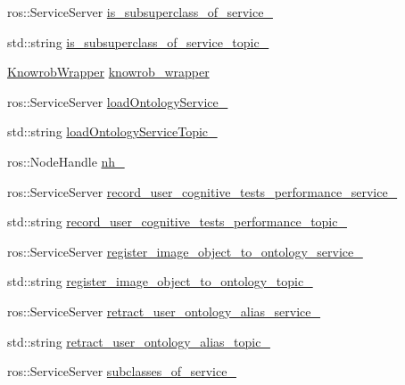 \begin{DoxyCompactItemize}
\item 
ros\-::\-Service\-Server \hyperlink{classKnowrobWrapperCommunications_a9b20954a7983e1a0f842161d06555484}{is\-\_\-subsuperclass\-\_\-of\-\_\-service\-\_\-}
\item 
std\-::string \hyperlink{classKnowrobWrapperCommunications_ab7d3b5d16106e51472f8fcb771be96aa}{is\-\_\-subsuperclass\-\_\-of\-\_\-service\-\_\-topic\-\_\-}
\item 
\hyperlink{classKnowrobWrapper}{Knowrob\-Wrapper} \hyperlink{classKnowrobWrapperCommunications_a6f4d52c56702c85b21b96df9caf95f46}{knowrob\-\_\-wrapper}
\item 
ros\-::\-Service\-Server \hyperlink{classKnowrobWrapperCommunications_aa0e819f7420b8e9f5315b9cfaac53bf4}{load\-Ontology\-Service\-\_\-}
\item 
std\-::string \hyperlink{classKnowrobWrapperCommunications_a6d5a84e3b69d020b5e11595a2ae871b5}{load\-Ontology\-Service\-Topic\-\_\-}
\item 
ros\-::\-Node\-Handle \hyperlink{classKnowrobWrapperCommunications_afe35871d80ea79c6446d2bdf39ba6204}{nh\-\_\-}
\item 
ros\-::\-Service\-Server \hyperlink{classKnowrobWrapperCommunications_a17e239928cdfac593e27e015e70ad376}{record\-\_\-user\-\_\-cognitive\-\_\-tests\-\_\-performance\-\_\-service\-\_\-}
\item 
std\-::string \hyperlink{classKnowrobWrapperCommunications_a1e44e99eba8f3a2fb196a9d215cec89c}{record\-\_\-user\-\_\-cognitive\-\_\-tests\-\_\-performance\-\_\-topic\-\_\-}
\item 
ros\-::\-Service\-Server \hyperlink{classKnowrobWrapperCommunications_a80d24d312e258d4b546573d4eaeb6a16}{register\-\_\-image\-\_\-object\-\_\-to\-\_\-ontology\-\_\-service\-\_\-}
\item 
std\-::string \hyperlink{classKnowrobWrapperCommunications_aeeadfeab13814b51e78182bb52358303}{register\-\_\-image\-\_\-object\-\_\-to\-\_\-ontology\-\_\-topic\-\_\-}
\item 
ros\-::\-Service\-Server \hyperlink{classKnowrobWrapperCommunications_a281262d96049a59096a5a29fbaac77d2}{retract\-\_\-user\-\_\-ontology\-\_\-alias\-\_\-service\-\_\-}
\item 
std\-::string \hyperlink{classKnowrobWrapperCommunications_afde9fb500053dd1ac1605af6728f03f0}{retract\-\_\-user\-\_\-ontology\-\_\-alias\-\_\-topic\-\_\-}
\item 
ros\-::\-Service\-Server \hyperlink{classKnowrobWrapperCommunications_aa694eb182b48822ca845e34096b17ad4}{subclasses\-\_\-of\-\_\-service\-\_\-}

\end{DoxyCompactItemize}
